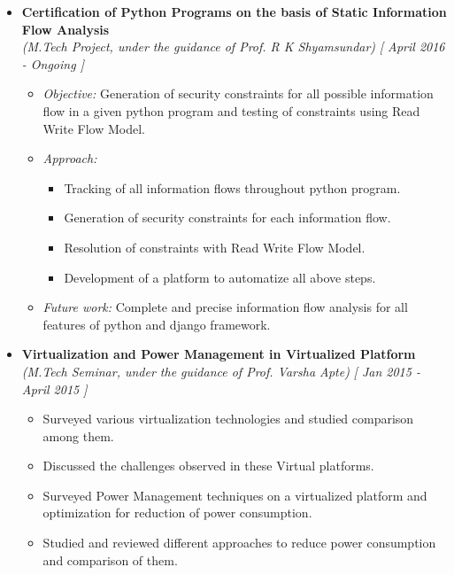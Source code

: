\begin{itemize}
\item \textbf{Certification of Python Programs on the basis of Static Information Flow Analysis} \\
      \emph{(M.Tech Project, under the guidance of Prof. R K Shyamsundar)} \hfill {\emph{[ April 2016 - Ongoing ]}} \\[-0.6cm]
      \begin{itemize}
  \item \textit{Objective:} Generation of security constraints for all possible information flow in a given python program and testing of constraints using Read Write Flow Model.\\[-0.5cm]
 	  	  
  \item \textit{Approach:} \\[-0.5cm]
   \begin{itemize}
 \item Tracking of all information flows throughout python program.
 \item Generation of security constraints for each information flow.
 \item Resolution of constraints with Read Write Flow Model.
 \item Development of a platform to automatize all above steps. \\[-0.5cm]
   \end{itemize}
  \item \textit{Future work:} 
  Complete and precise information flow analysis for all features of python and django framework.\\[-0.5cm]
  	        \end{itemize}
\item \textbf{Virtualization and Power Management in Virtualized Platform} \\
\emph{(M.Tech Seminar, under the guidance of Prof. Varsha Apte)} \hfill {\emph{[ Jan 2015 - April 2015 ]}} \\[-0.6cm]
\begin{itemize}
	\item Surveyed various virtualization technologies and studied comparison among them. \\[-0.5cm]
	\item Discussed the challenges observed in these Virtual platforms. \\[-0.5cm]
	\item Surveyed Power Management techniques on a virtualized platform and optimization for reduction of power consumption. \\[-0.5cm]
	\item Studied and reviewed different approaches to reduce power consumption and comparison of them.
\end{itemize}


\end{itemize}
